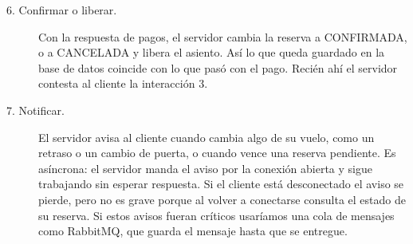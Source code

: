 \begin{description}
  \item[6. Confirmar o liberar.] Con la respuesta de pagos, el servidor cambia la reserva a CONFIRMADA, o a CANCELADA y libera el asiento. Así lo que queda guardado en la base de datos coincide con lo que pasó con el pago. Recién ahí el servidor contesta al cliente la interacción 3.

  \item[7. Notificar.] El servidor avisa al cliente cuando cambia algo de su vuelo, como un retraso o un cambio de puerta, o cuando vence una reserva pendiente. Es asíncrona: el servidor manda el aviso por la conexión abierta y sigue trabajando sin esperar respuesta. Si el cliente está desconectado el aviso se pierde, pero no es grave porque al volver a conectarse consulta el estado de su reserva. Si estos avisos fueran críticos usaríamos una cola de mensajes como RabbitMQ, que guarda el mensaje hasta que se entregue.
\end{description}
